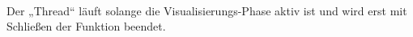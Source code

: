 \\
Der „Thread“ läuft solange die Visualisierungs-Phase aktiv ist und wird erst mit Schließen der Funktion beendet.

